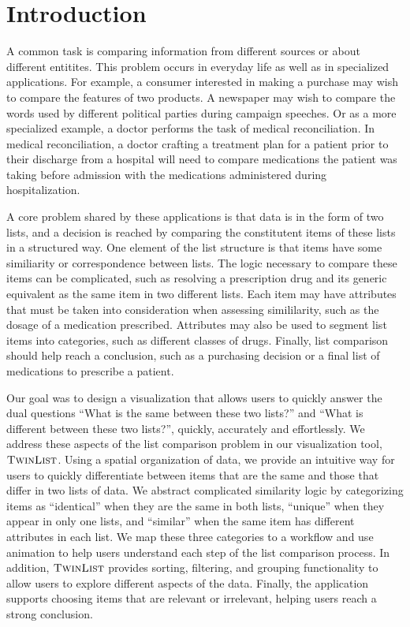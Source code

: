 \documentclass{chi2009}
\newcommand{\TwinList}{\textsc{TwinList}}
\begin{document}


\section{Introduction}
A common task is comparing information from different sources or about different entitites. This problem occurs in everyday life as well as in specialized applications. For example, a consumer interested in making a purchase may wish to compare the features of two products. A newspaper may wish to compare the words used by different political parties during campaign speeches. Or as a more specialized example, a doctor performs the task of medical reconciliation. In medical reconciliation, a doctor crafting a treatment plan for a patient prior to their discharge from a hospital will need to compare medications the patient was taking before admission with the medications administered during hospitalization. 

A core problem shared by these applications is that data is in the form of two lists, and a decision is reached by comparing the constitutent items of these lists in a structured way. One element of the list structure is that items have some similiarity or correspondence between lists. The logic necessary to compare these items can be complicated, such as resolving a prescription drug and its generic equivalent as the same item in two different lists. Each item may have attributes that must be taken into consideration when assessing simililarity, such as the dosage of a medication prescribed. Attributes may also be used to segment list items into categories, such as different classes of drugs. Finally, list comparison should help reach a conclusion, such as a purchasing decision or a final list of medications to prescribe a patient.

Our goal was to design a visualization that allows users to quickly answer the dual questions ``What is the same between these two lists?'' and ``What is different between these two lists?'', quickly, accurately and effortlessly. We address these aspects of the list comparison problem in our visualization tool, $\TwinList$. Using a spatial organization of data, we provide an intuitive way for users to quickly differentiate between items that are the same and those that differ in two lists of data. We abstract complicated similarity logic by categorizing items as ``identical'' when they are the same in both lists, ``unique'' when they appear in only one lists, and ``similar'' when the same item has different attributes in each list. We map these three categories to a workflow and use animation to help users understand each step of the list comparison process. In addition, $\TwinList$ provides sorting, filtering, and grouping functionality to allow users to explore different aspects of the data. Finally, the application supports choosing items that are relevant or irrelevant, helping users reach a strong conclusion. 
\end{document}
